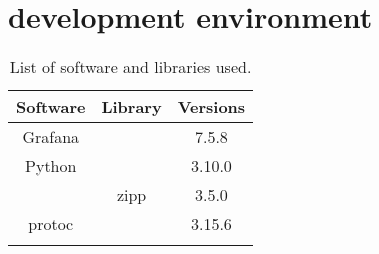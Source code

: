 \chapter{development environment}

    \begin{longtable}{|c|c|c|}        
        \hline
        \textbf{Software} & \textbf{Library} & \textbf{Versions} \\
        \hline
        \endhead

        Grafana & & 7.5.8 \\
        \hline
        Python & & 3.10.0 \\
  
        & zipp & 3.5.0 \\
        \hline
        protoc  &   & 3.15.6 \\
        \hline
        \caption{List of software and libraries used.}\label{app:software_environment} \\
    \end{longtable}
